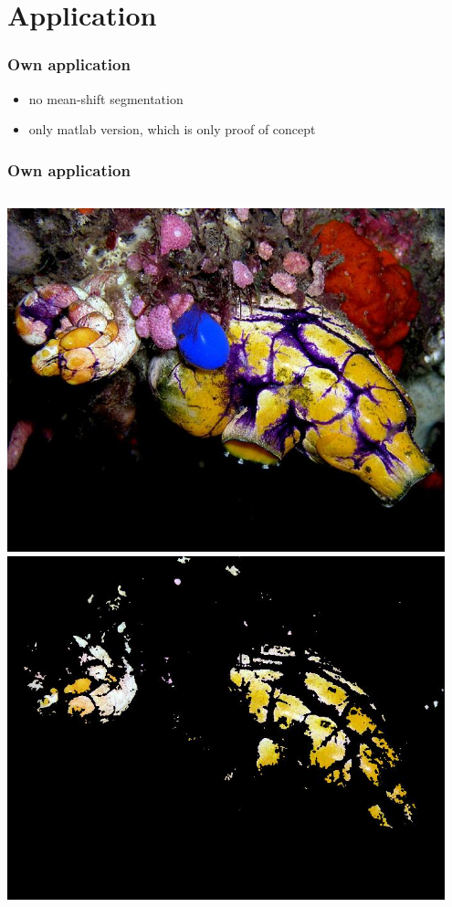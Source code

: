 \documentclass{beamer}
\begin{document}
\section{Application}

\begin{frame}
    \frametitle{Own application}
    \begin{itemize}
        \item no mean-shift segmentation
        \item only matlab version, which is only proof of concept
    \end{itemize}
\end{frame}

\begin{frame}
    \frametitle{Own application}
    \begin{columns}
            \centering
            \includegraphics[width=0.95\textwidth]{report-images/Polycarpa_Nick_Hobgood.jpg}
            \centering
            \includegraphics[width=0.95\textwidth]{report-images/thresh_Polycarpa_Nick_Hobgood.jpg}
    \end{columns}
\end{frame}
\end{document}
